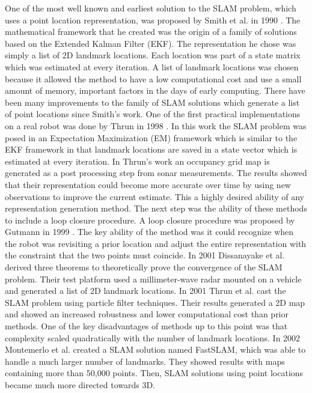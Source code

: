 One of the most well known and earliest solution to the SLAM problem, which
uses a point location representation, was proposed by Smith et al. in 1990
\cite{Smith1990}. The mathematical framework that he created was the origin
of a family of solutions based on the Extended Kalman Filter (EKF). The
representation he chose was simply a list of 2D landmark locations. Each
location was part of a state matrix which was estimated at every iteration.
A list of landmark locations was chosen because it allowed the method to
have a low computational cost and use a small amount of memory, important
factors in the days of early computing. There have been many improvements
to the family of SLAM solutions which generate a list of point locations
since Smith's work. One of the first practical implementations on a real
robot was done by Thrun in 1998 \cite{Thrun1998}. In this work the SLAM
problem was posed in an Expectation Maximization (EM) framework which is
similar to the EKF framework in that landmark locations are saved
in a state vector which is estimated at every iteration. In Thrun's work an
occupancy grid map is generated as a post processing step from sonar
measurements. The results showed that their representation could become
more accurate over time by using new observations to improve the current
estimate. This a highly desired ability of any representation generation
method. The next step was the ability of these methods to include a loop
closure procedure. A loop closure procedure was proposed by Gutmann in 1999
\cite{Gutmann1999}. The key ability of the method was it could recognize
when the robot was revisiting a prior location and adjust the entire
representation with the constraint that the two points must coincide. In
2001 Dissanayake et al. \cite{Dissanayake2001} derived three theorems to
theoretically prove the convergence of the SLAM problem. Their test
platform used a millimeter-wave radar mounted on a vehicle and generated a
list of 2D landmark locations. In 2001 Thrun et al. \cite{Thrun2001} cast
the SLAM problem using particle filter techniques. Their results generated
a 2D map and showed an increased robustness and lower computational cost
than prior methods. One of the key disadvantages of methods up to this
point was that complexity scaled quadratically with the number of landmark
locations. In 2002 Montemerlo et al. \cite{Montemerlo2002} created a SLAM
solution named FastSLAM, which was able to handle a much larger number of
landmarks. They showed results with maps containing more than 50,000
points. Then, SLAM solutions using point locations became much more
directed towards 3D.

